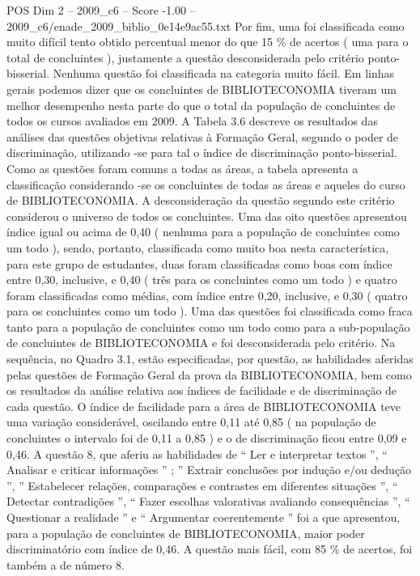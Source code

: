 \begin{textsample}{POS Dim 2 – 2009\_c6 – Score -1.00 – 2009\_c6/enade\_2009\_biblio\_0e14e9ac55.txt}
Por fim, uma foi classificada como muito difícil tento obtido percentual menor do que 15 \% de acertos ( uma para o total de concluintes ), justamente a questão desconsiderada pelo critério ponto-bisserial.
Nenhuma questão foi classificada na categoria muito fácil.
Em linhas gerais podemos dizer que os concluintes de BIBLIOTECONOMIA tiveram um melhor desempenho nesta parte do que o total da população de concluintes de todos os cursos avaliados em 2009.
A Tabela 3.6 descreve os resultados das análises das questões objetivas relativas à Formação Geral, segundo o poder de discriminação, utilizando -se para tal o índice de discriminação ponto-bisserial.
Como as questões foram comuns a todas as áreas, a tabela apresenta a classificação considerando -se os concluintes de todas as áreas e aqueles do curso de BIBLIOTECONOMIA.
A desconsideração da questão segundo este critério considerou o universo de todos os concluintes.
Uma das oito questões apresentou índice igual ou acima de 0,40 ( nenhuma para a população de concluintes como um todo ), sendo, portanto, classificada como muito boa nesta característica, para este grupo de estudantes, duas foram classificadas como boas com índice entre 0,30, inclusive, e 0,40 ( três para os concluintes como um todo ) e quatro foram classificadas como médias, com índice entre 0,20, inclusive, e 0,30 ( quatro para os concluintes como um todo ).
Uma das questões foi classificada como fraca tanto para a população de concluintes como um todo como para a sub-população de concluintes de BIBLIOTECONOMIA e foi desconsiderada pelo critério.
Na sequência, no Quadro 3.1, estão especificadas, por questão, as habilidades aferidas pelas questões de Formação Geral da prova da BIBLIOTECONOMIA, bem como os resultados da análise relativa aos índices de facilidade e de discriminação de cada questão.
O índice de facilidade para a área de BIBLIOTECONOMIA teve uma variação considerável, oscilando entre 0,11 até 0,85 ( na população de concluintes o intervalo foi de 0,11 a 0,85 ) e o de discriminação ficou entre 0,09 e 0,46.
A questão 8, que aferiu as habilidades de “ Ler e interpretar textos ”, “ Analisar e criticar informações ” ; ” Extrair conclusões por indução e/ou dedução ”, ” Estabelecer relações, comparações e contrastes em diferentes situações ”, “ Detectar contradições ”, “ Fazer escolhas valorativas avaliando consequências ”, “ Questionar a realidade ” e “ Argumentar coerentemente ” foi a que apresentou, para a população de concluintes de BIBLIOTECONOMIA, maior poder discriminatório com índice de 0,46.
A questão mais fácil, com 85 \% de acertos, foi também a de número 8.

\end{textsample}
